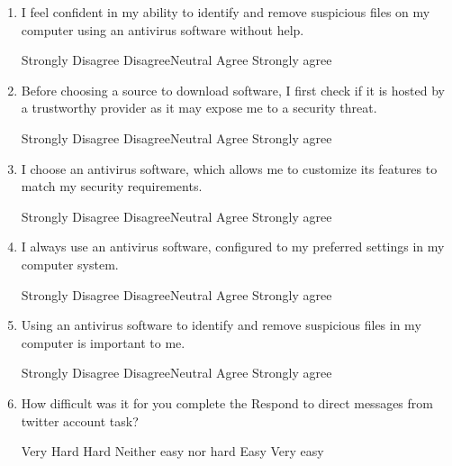 \documentclass[doctor]{thesis} %
\theoremstyle{plain}
\begin{document}
\begin{enumerate}[noitemsep]
\item I feel confident in my ability to identify and remove suspicious files on my computer using an antivirus software without help.
\par Strongly Disagree \hspace{1cm} Disagree\hspace{1cm}Neutral\hspace{1cm} Agree\hspace{1cm} Strongly agree
\item Before choosing a source to download software, I first check if it is hosted by a trustworthy provider as it may expose me to a security threat.
\par Strongly Disagree \hspace{1cm} Disagree\hspace{1cm}Neutral\hspace{1cm} Agree\hspace{1cm} Strongly agree
\item I choose an antivirus software, which allows me to customize its features to match my security requirements.
\par Strongly Disagree \hspace{1cm} Disagree\hspace{1cm}Neutral\hspace{1cm} Agree\hspace{1cm} Strongly agree
\item I always use an antivirus software, configured to my preferred settings in my computer system.
\par Strongly Disagree \hspace{1cm} Disagree\hspace{1cm}Neutral\hspace{1cm} Agree\hspace{1cm} Strongly agree
\item Using an antivirus software to identify and remove suspicious files in my computer is important to me.
\par Strongly Disagree \hspace{1cm} Disagree\hspace{1cm}Neutral\hspace{1cm} Agree\hspace{1cm} Strongly agree
\item How difficult was it for you complete the Respond to direct messages from twitter account task?
\par Very Hard \hspace{1cm} Hard \hspace{1cm} Neither easy nor hard \hspace{1cm} Easy \hspace{1cm} Very easy

\end{enumerate}
\end{document}
